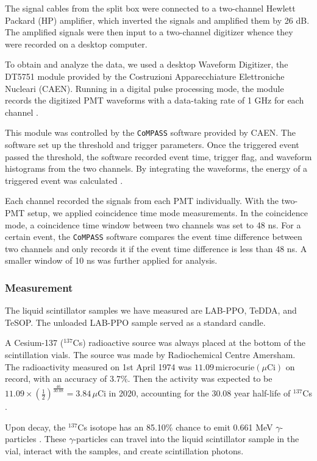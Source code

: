 The signal cables from the split box were connected to a two-channel Hewlett Packard (HP) amplifier, which inverted the signals and amplified them by 26 dB. The amplified signals were then input to a two-channel digitizer whence they were recorded on a desktop computer.

To obtain and analyze the data, we used a desktop Waveform Digitizer, the DT5751 module provided by the Costruzioni Apparecchiature Elettroniche Nucleari (CAEN). Running in a digital pulse processing mode, the module records the digitized PMT waveforms with a data-taking rate of 1 GHz for each channel \cite{caen}.

This module was controlled by the \texttt{CoMPASS} software provided by CAEN. The software set up the threshold and trigger parameters. Once the triggered event passed the threshold, the software recorded event time, trigger flag, and waveform histograms from the two channels. By integrating the waveforms, the energy of a triggered event was calculated \cite{compass}.

Each channel recorded the signals from each PMT individually. With the two-PMT setup, we applied coincidence time mode measurements. In the coincidence mode, a coincidence time window between two channels was set to 48 ns. For a certain event, the \texttt{CoMPASS} software compares the event time difference between two channels and only records it if the event time difference is less than 48 ns. A smaller window of 10 ns was further applied for analysis.

\subsubsection{Measurement}

The liquid scintillator samples we have measured are LAB-PPO, TeDDA, and TeSOP. The unloaded LAB-PPO sample served as a standard candle.

A Cesium-137 ($^{137}$Cs) radioactive source was always placed at the bottom of the scintillation vials.
The source was made by Radiochemical Centre Amersham. The radioactivity measured on 1st April 1974 was $11.09 \, \mathrm{microcurie}(\mu\mathrm{Ci})$ on record, with an accuracy of $3.7\%$. Then the activity was expected to be 
$11.09\times ({\frac{1}{2}})^{\frac{46}{30.08}}=3.84 \, \mu\mathrm{Ci}$ in 2020, accounting for the 30.08 year half-life of $^{137}$Cs \cite{nndc}.

Upon decay, the $^{137}$Cs isotope has an 85.10\% chance to emit 0.661 MeV $\gamma$-particles \cite{nndc}. These $\gamma$-particles can travel into the liquid scintillator sample in the vial, interact with the samples, and create scintillation photons.

